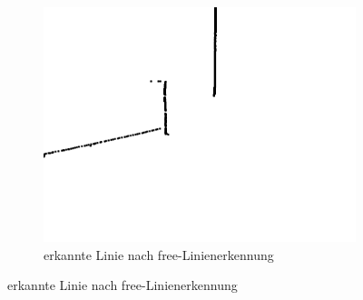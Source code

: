 \documentclass[ngerman,a4paper,parskip=half]{scrartcl}
\begin{document}
\begin{figure}[H]
\begin{subfigure}{0.32\textwidth}
		\includegraphics[width=\textwidth]{includes/blue_0_free.png}
		\caption{erkannte Linie nach free-Linienerkennung}
		\label{fig:blue_0_free}
	\end{subfigure}
	

\end{figure}
\end{document}
